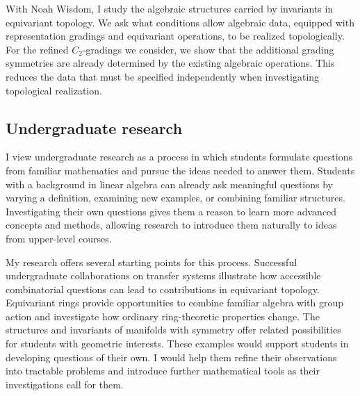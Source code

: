 \documentclass[10pt]{article}
\begin{document}
With Noah Wisdom, I study the algebraic structures carried by invariants in equivariant topology.
We ask what conditions allow algebraic data, equipped with representation gradings and equivariant operations, to be realized topologically.
For the refined $C_2$-gradings we consider, we show that the additional grading symmetries are already determined by the existing algebraic operations.
This reduces the data that must be specified independently when investigating topological realization.

\subsection*{Undergraduate research}
I view undergraduate research as a process in which students formulate questions from familiar mathematics and pursue the ideas needed to answer them.
Students with a background in linear algebra can already ask meaningful questions by varying a definition, examining new examples, or combining familiar structures.
Investigating their own questions gives them a reason to learn more advanced concepts and methods, allowing research to introduce them naturally to ideas from upper-level courses.

My research offers several starting points for this process.
Successful undergraduate collaborations on transfer systems illustrate how accessible combinatorial questions can lead to contributions in equivariant topology.
Equivariant rings provide opportunities to combine familiar algebra with group action and investigate how ordinary ring-theoretic properties change.
The structures and invariants of manifolds with symmetry offer related possibilities for students with geometric interests.
These examples would support students in developing questions of their own.
I would help them refine their observations into tractable problems and introduce further mathematical tools as their investigations call for them.




\end{document}
